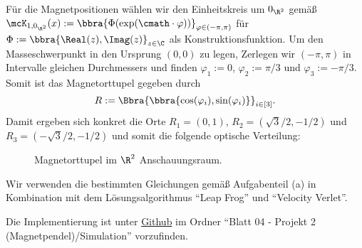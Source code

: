 \documentclass{article}
\begin{document}
        \subaufgabe{}
            Für die Magnetpositionen wählen wir den Einheitskreis um $0_{\R^2}$ gemäß $\mcK_{1,0_{\R^2}}(x):=\bbra{\Phi({\exp}(\cmath\cdot\varphi))}_{\varphi\in(-\pi,\pi)}$ für $\Phi:=\bbra{\Real(z),\Imag(z)}_{z\in\C}$ als Konstruktionsfunktion. Um den Masseschwerpunkt in den Ursprung $(0,0)$ zu legen, Zerlegen wir $(-\pi,\pi)$ in Intervalle gleichen Durchmessers und finden $\varphi_1:=0$, $\varphi_2:=\pi/3$ und $\varphi_3:=-\pi/3$. Somit ist das Magnetorttupel gegeben durch
            \[
                R:=\Bbra{\bbra{\cos(\varphi_i),\sin(\varphi_i)}}_{i\in[3]}.
            \]
            Damit ergeben sich konkret die Orte $R_1 = (0,1)$, $R_2 = (\sqrt{3}/2,-1/2)$ und $R_3 = (-\sqrt{3}/2,-1/2)$ und somit die folgende optische Verteilung:
            \begin{figure}[H]
                \centering
                \caption{Magnetorttupel im $\R^2$ Anschauungsraum.}
            \end{figure}

        
        \subaufgabe{}
            Wir verwenden die bestimmten Gleichungen gemäß Aufgabenteil (a) in Kombination mit dem Lösungsalgorithmus \enquote{Leap Frog} und \enquote{Velocity Verlet}. 

        \subaufgabe{}
            Die Implementierung ist unter \href{https://github.com/unb3rechenbar/ComputerPhysik-I-Projekte.git}{Github} im Ordner \enquote{Blatt 04 - Projekt 2 (Magnetpendel)/Simulation} vorzufinden. 
 
        \subaufgabe{}

        \subaufgabe{}
        
\end{document}
